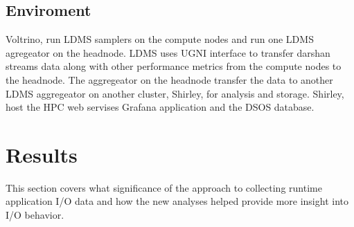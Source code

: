 \subsection{Enviroment}
Voltrino, run LDMS samplers on the compute nodes and run one LDMS agregeator on the headnode. LDMS uses UGNI interface to transfer darshan streams data along with other performance metrics from the compute nodes to the headnode. The aggregeator on the headnode transfer the data to another LDMS aggregeator on another cluster, Shirley, for analysis and storage. Shirley, host the HPC web servises Grafana application and the DSOS database. 



\section{Results}
This section covers what significance of the approach to collecting runtime application I/O data and how the new analyses helped provide more insight into I/O behavior. 

